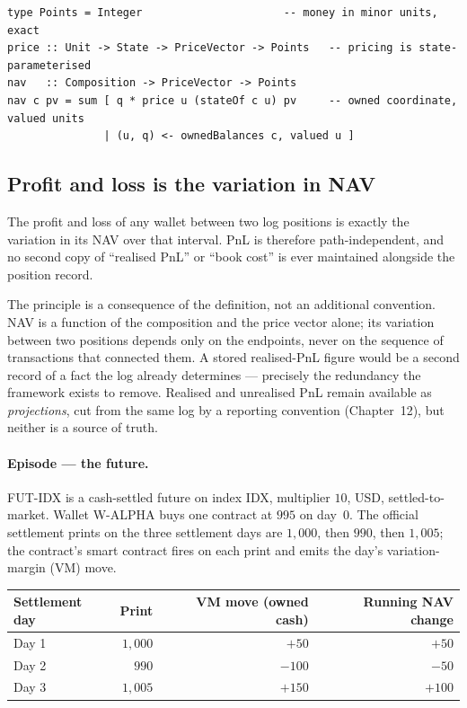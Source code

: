 \begin{lstlisting}
type Points = Integer                      -- money in minor units, exact
price :: Unit -> State -> PriceVector -> Points   -- pricing is state-parameterised
nav   :: Composition -> PriceVector -> Points
nav c pv = sum [ q * price u (stateOf c u) pv     -- owned coordinate, valued units
               | (u, q) <- ownedBalances c, valued u ]
\end{lstlisting}

\subsection{Profit and loss is the variation in NAV}

\begin{principle}
The profit and loss of any wallet between two log positions is exactly the
variation in its NAV over that interval. PnL is therefore path-independent,
and no second copy of ``realised PnL'' or ``book cost'' is ever maintained
alongside the position record.
\end{principle}

The principle is a consequence of the definition, not an additional
convention. NAV is a function of the composition and the price vector alone;
its variation between two positions depends only on the endpoints, never on
the sequence of transactions that connected them. A stored realised-PnL figure
would be a second record of a fact the log already determines --- precisely
the redundancy the framework exists to remove. Realised and unrealised PnL
remain available as \emph{projections}, cut from the same log by a reporting
convention (Chapter~12), but neither is a source of truth.

\paragraph{Episode --- the future.}
FUT-IDX is a cash-settled future on index IDX, multiplier $10$, USD,
settled-to-market. Wallet W-ALPHA buys one contract at $995$ on day~0. The
official settlement prints on the three settlement days are $1{,}000$, then
$990$, then $1{,}005$; the contract's smart contract fires on each print and
emits the day's variation-margin (VM) move.

\begin{center}
\begin{tabular}{lrrr}
\toprule
Settlement day & Print & VM move (owned cash) & Running NAV change \\
\midrule
Day 1 & $1{,}000$ & $+50$ & $+50$ \\
Day 2 & $\phantom{0}990$ & $-100$ & $-50$ \\
Day 3 & $1{,}005$ & $+150$ & $+100$ \\
\bottomrule
\end{tabular}
\end{center}

